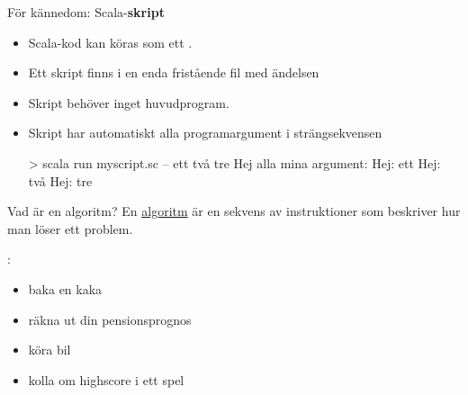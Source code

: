 \begin{Slide}{För kännedom: Scala-\textbf{skript}}
\begin{itemize}
  \SlideFontSmall
  \item 
Scala-kod kan köras som ett .
\item Ett skript finns i en enda fristående fil med ändelsen 
\item Skript behöver inget huvudprogram. 
\item Skript har automatiskt alla programargument i strängsekvensen 

\begin{REPLnonum}
> scala run myscript.sc -- ett två tre
Hej alla mina argument:
Hej: ett
Hej: två
Hej: tre
\end{REPLnonum}
\end{itemize}
\end{Slide}




\begin{Slide}{Vad är en algoritm?}
En \href{https://sv.wikipedia.org/wiki/Algoritm}{algoritm} är en sekvens av instruktioner som beskriver hur man löser ett problem.

\vspace{1em}:
\begin{itemize}
\item	 baka en kaka
\pause\item räkna ut din pensionsprognos
\pause\item köra bil
\pause\item kolla om highscore i ett spel
\end{itemize}
\ifkompendium\else
{}
\fi
\end{Slide}


